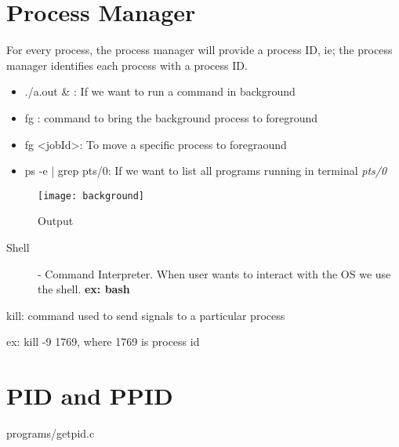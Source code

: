 \documentclass[11pt,fleqn]{book} %
\begin{document}
\section{Process Manager}
For every process, the process manager will provide a process ID, ie; the process manager identifies each process with a process ID.

\begin{myremark}{}
\begin{itemize}
	\item ./a.out \& : If we want to run a command in background
	
	\item fg : command to bring the background process to foreground
	
	\item fg <jobId>: To move a specific process to foregraound
	
	\item ps -e | grep pts/0: If we want to list all programs running in terminal \textit{pts/0}

\end{itemize}
\end{myremark}

\begin{figure}[h]
\centering\texttt{[image: background]}
\caption{Output}
\end{figure}

\begin{description}
	\item[Shell] - Command Interpreter. When user wants to interact with the OS we use the shell. \textbf{ex: bash}
\end{description}


\begin{myremark}{}
kill: command used to send signals to a particular process

ex: kill -9 1769, where 1769 is process id

\end{myremark}



\section{PID and PPID}

\begin{mycode}{programs/getpid.c}
\end{mycode}
\end{document}
